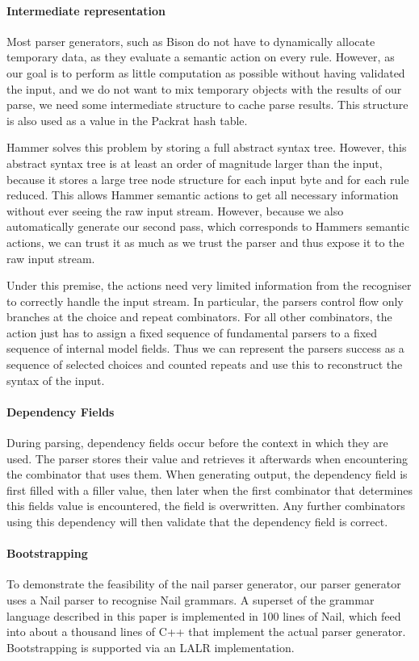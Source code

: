 \documentclass[10pt]{article}
\begin{document}
\paragraph{Intermediate representation}
Most parser generators, such as Bison do not have to dynamically allocate temporary
data, as they evaluate a semantic action on every rule. However, as our goal is to perform as little
computation as possible without having validated the input, and we do not want to mix temporary
objects with the results of our parse, we need some intermediate structure to cache parse results.
This structure is also used as a value in the Packrat hash table. 

Hammer solves this problem by storing a full abstract syntax tree. However, this abstract syntax
tree is at least an order of magnitude larger than the input, because it stores a large tree node
structure for each input byte and for each rule reduced. This allows Hammer semantic actions to get
all necessary information without ever seeing the raw input stream. However, because we also
automatically generate our second pass, which corresponds to Hammers semantic actions, we can trust
it as much as we trust the parser and thus expose it to the raw input stream. 

Under this premise, the actions need very limited information from the recogniser to correctly
handle the input stream. In particular, the parsers control flow only branches at the choice and
repeat combinators. For all other combinators, the action just has to assign a fixed sequence of
fundamental parsers to a fixed sequence of internal model fields. 
Thus we can represent the parsers success as a sequence of selected choices and counted repeats and
use this to reconstruct the syntax of the input. %
\paragraph{Dependency Fields}
During parsing, dependency fields occur before the context in which they are used. The parser stores
their value and retrieves it afterwards when encountering the combinator that uses them. When
generating output, the dependency field is first filled with a filler value, then later when the
first combinator that determines this fields value is encountered, the field is overwritten. Any
further combinators using this dependency will then validate that the dependency field is correct. 
\paragraph{Bootstrapping}
To demonstrate the feasibility of the nail parser generator, our parser generator uses a Nail parser
to recognise Nail grammars. A superset of the grammar language described in this paper is
implemented in 100 lines of Nail, which feed into about a thousand lines of C++ that implement the
actual parser generator. Bootstrapping is supported via an LALR implementation.
\end{document}
